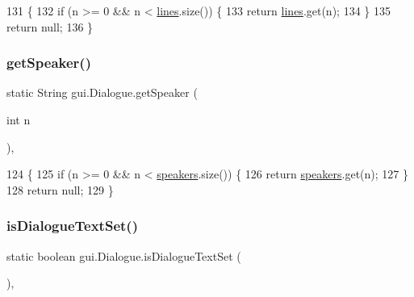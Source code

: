 \begin{DoxyCode}
131                                         \{
132         \textcolor{keywordflow}{if} (n >= 0 && n < \mbox{\hyperlink{classgui_1_1_dialogue_a83efa9d7d08512fd59390c8ecaade1f7}{lines}}.size()) \{
133             \textcolor{keywordflow}{return} \mbox{\hyperlink{classgui_1_1_dialogue_a83efa9d7d08512fd59390c8ecaade1f7}{lines}}.get(n);
134         \}
135         \textcolor{keywordflow}{return} null;
136     \}
\end{DoxyCode}
\mbox{\label{classgui_1_1_dialogue_a38d0eafda7f6ef2ac00de87acd23ab8e}} 
\subsubsection{\texorpdfstring{get\+Speaker()}{getSpeaker()}}
{\footnotesize\ttfamily static String gui.\+Dialogue.\+get\+Speaker (\begin{DoxyParamCaption}\item[{int}]{n }\end{DoxyParamCaption})\hspace{0.3cm}{\ttfamily [inline]}, {\ttfamily [static]}}


\begin{DoxyCode}
124                                            \{
125         \textcolor{keywordflow}{if} (n >= 0 && n < \mbox{\hyperlink{classgui_1_1_dialogue_a0c75cc6f6e28bb1c6807d78a11adf807}{speakers}}.size()) \{
126             \textcolor{keywordflow}{return} \mbox{\hyperlink{classgui_1_1_dialogue_a0c75cc6f6e28bb1c6807d78a11adf807}{speakers}}.get(n);
127         \}
128         \textcolor{keywordflow}{return} null;
129     \}
\end{DoxyCode}
\mbox{\label{classgui_1_1_dialogue_a9ac45a6b6c4dd6e20f3ea3ad0af2b4b9}} 
\subsubsection{\texorpdfstring{is\+Dialogue\+Text\+Set()}{isDialogueTextSet()}}
{\footnotesize\ttfamily static boolean gui.\+Dialogue.\+is\+Dialogue\+Text\+Set (\begin{DoxyParamCaption}{ }\end{DoxyParamCaption})\hspace{0.3cm}{\ttfamily [inline]}, {\ttfamily [static]}}


